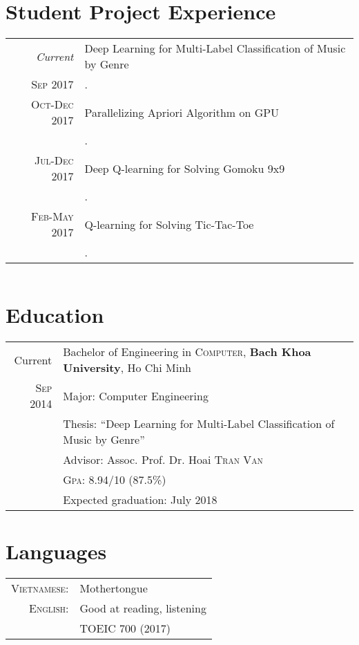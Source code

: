 \documentclass[a4paper,10pt]{article}
\begin{document}
\section{Student Project Experience}
\begin{tabular}{r|p{11cm}}
	\emph{Current} & Deep Learning for Multi-Label Classification of Music by Genre\\ 
	\textsc{Sep 2017} & \footnotesize{.}\\
	\textsc{Oct-Dec 2017} & Parallelizing Apriori Algorithm on GPU\\
	& \footnotesize{.}	\\
	\textsc{Jul-Dec 2017} & Deep Q-learning for Solving Gomoku 9x9 \\
	& \footnotesize{.} \\
	\textsc{Feb-May 2017} & Q-learning for Solving Tic-Tac-Toe \\
	& \footnotesize{.} \\
\end{tabular}

\begin{tabular}{r|p{11cm}}
\end{tabular}
\section{Education}
\begin{tabular}{rl}
	Current           & Bachelor of Engineering in \textsc{Computer}, \textbf{Bach Khoa University}, Ho Chi Minh \\
	\textsc{Sep} 2014 & Major: Computer Engineering                                                              \\
	                  & Thesis: ``Deep Learning for Multi-Label Classification of Music by Genre''
	\\
	                  & \small Advisor: Assoc. Prof. Dr. Hoai \textsc{Tran Van}
	\\
	                  & \normalsize \textsc{Gpa}: 8.94/10 (87.5\%)                                               \\
	                  & Expected graduation: July 2018
\end{tabular}

\section{Languages}
\begin{tabular}{rl}
	\textsc{Vietnamese:} & Mothertongue               \\
	\textsc{English:}    & Good at reading, listening \\
	                     & TOEIC 700 (2017)           \\
\end{tabular}
\end{document}
